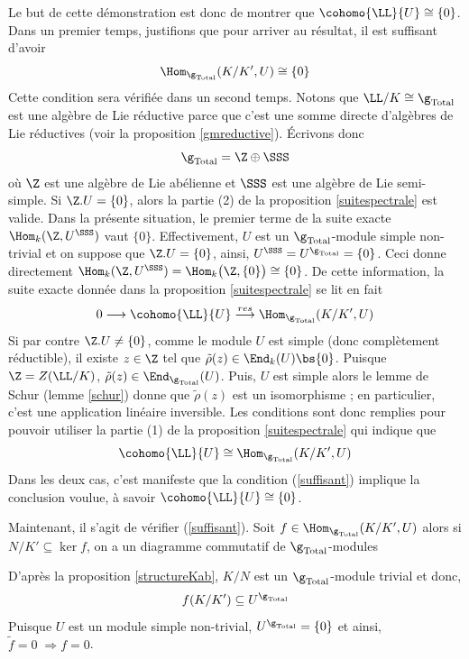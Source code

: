 \begin{Prop}
\begin{pre}
Le but de cette démonstration est donc de montrer que $\cohomo{\LL}{U} \cong \{0\}$. Dans un premier temps, justifions que pour arriver au résultat, il est suffisant d'avoir 
\begin{equation} \label{suffisant}
\Hom_{\g_\text{Total}}(K/K',U) \cong \{0\}
\end{equation} 
Cette condition sera vérifiée dans un second temps. Notons que $\LL/K \cong \g_\text{Total}$ est une algèbre de Lie réductive parce que c'est une somme directe d'algèbres de Lie réductives (voir la proposition \ref{gmreductive}). Écrivons donc 
$$ \g_\text{Total} = \Z \oplus \SSS $$
où $\Z$ est une algèbre de Lie abélienne et $\SSS$ est une algèbre de Lie semi-simple. Si $\Z.U = \{0\}$, alors la partie (2) de la proposition \ref{suitespectrale} est valide. Dans la présente situation, le premier terme de la suite exacte $\Hom_k(\Z,U^\SSS)$ vaut $\{0\}$. Effectivement, $U$ est un $\g_\text{Total}$-module simple non-trivial et on suppose que $\Z.U = \{0\}$, ainsi, $U^\SSS = U^{\g_\text{Total}} = \{0\}$. Ceci donne directement $\Hom_k(\Z,U^\SSS) = \Hom_k\big(\Z,\{0\}\big) \cong \{0\}$. De cette information, la suite exacte donnée dans la proposition \ref{suitespectrale} se lit en fait 
$$ 0 \longrightarrow \cohomo{\LL}{U} \stackrel{res}{\longrightarrow} \Hom_{\g_\text{Total}}(K/K',U) $$
Si par contre $\Z.U \neq \{0\}$, comme le module $U$ est simple (donc complètement réductible), il existe $z \in \Z$ tel que $\tilde{\rho}(z) \in \End_k(U) \bs \{0\}$. Puisque $\Z = Z(\LL/K)$, $\tilde{\rho}(z) \in \End_{\g_\text{Total}}(U)$. Puis, $U$ est simple alors le lemme de Schur (lemme \ref{schur}) donne que $\tilde{\rho}(z)$ est un isomorphisme ; en particulier, c'est une application linéaire inversible. Les conditions sont donc remplies pour pouvoir utiliser la partie (1) de la proposition \ref{suitespectrale} qui indique que 
$$ \cohomo{\LL}{U} \cong \Hom_{\g_\text{Total}}(K/K',U) $$
Dans les deux cas, c'est manifeste que la condition (\ref{suffisant}) implique la conclusion voulue, à savoir $\cohomo{\LL}{U} \cong \{0\}$.

Maintenant, il s'agit de vérifier (\ref{suffisant}). Soit $f \in \Hom_{\g_\text{Total}}(K/K',U)$ alors si $N/K' \subseteq \ker f$, on a un diagramme commutatif de $\g_\text{Total}$-modules 
\begin{center} \end{center}
D'après la proposition \ref{structureKab}, $K/N$ est un $\g_\text{Total}$-module trivial et donc, 
$$ f(K/K') \subseteq U^{\g_\text{Total}} $$
Puisque $U$ est un module simple non-trivial, $U^{\g_\text{Total}} = \{0\}$ et ainsi, $\tilde{f} = 0 \; \Rightarrow f = 0$. 


\end{pre}
\end{Prop}
